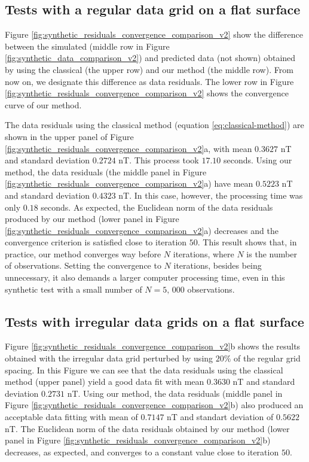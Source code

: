 \subsection*{Tests with a regular data grid on a flat surface}

Figure \ref{fig:synthetic_residuals_convergence_comparison_v2} show the 
difference between the simulated (middle row in Figure \ref{fig:synthetic_data_comparison_v2})
and predicted data (not shown) obtained by using the classical (the upper row) and 
our method (the middle row). From now on, we designate this difference as data residuals. 
The lower row in Figure \ref{fig:synthetic_residuals_convergence_comparison_v2} shows the 
convergence curve of our method.

The data residuals using the classical method (equation \ref{eq:classical-method})  
are shown in the upper panel of Figure \ref{fig:synthetic_residuals_convergence_comparison_v2}a, 
with mean $0.3627$ nT and standard deviation $0.2724$ nT. This process took $17.10$ seconds.
Using our method, the data residuals (the middle panel in Figure
\ref{fig:synthetic_residuals_convergence_comparison_v2}a) have mean $0.5223$ nT and standard
deviation $0.4323$ nT. In this case, however, the processing time was only $0.18$ seconds.
As expected, the Euclidean norm of the data residuals produced by our method 
(lower panel in Figure \ref{fig:synthetic_residuals_convergence_comparison_v2}a) decreases 
and the convergence criterion is satisfied close to iteration $50$. 
This result shows that, in practice, our method converges way before $N$ iterations,
where $N$ is the number of observations.
Setting the convergence to $N$ iterations, besides being unnecessary, it also demands a larger 
computer processing time, even in this synthetic test with a small number 
of $N = 5,\, 000$ observations.

\subsection*{Tests with irregular data grids on a flat surface}

Figure \ref{fig:synthetic_residuals_convergence_comparison_v2}b shows the results obtained
with the irregular data grid perturbed by using $20\%$ of the regular grid spacing.
In this Figure we can see that the data residuals 
using the classical method (upper panel) yield a good data fit with mean $0.3630$ nT and standard
deviation $0.2731$ nT. 
Using our method, the data residuals (middle panel in Figure 
\ref{fig:synthetic_residuals_convergence_comparison_v2}b) also produced an acceptable data 
fitting with mean of  $0.7147$ nT and standart deviation of $0.5622$ nT. 
The Euclidean norm of the data residuals obtained by our method 
(lower panel in Figure \ref{fig:synthetic_residuals_convergence_comparison_v2}b) decreases, 
as expected, and converges to a constant value close to iteration $50$. 

